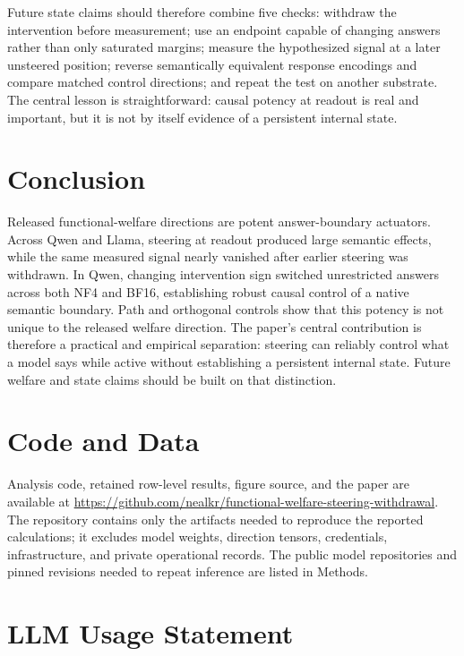 \documentclass[10pt,twocolumn]{article}
\begin{document}
Future state claims should therefore combine five checks: withdraw the intervention before measurement; use an endpoint capable of changing answers rather than only saturated margins; measure the hypothesized signal at a later unsteered position; reverse semantically equivalent response encodings and compare matched control directions; and repeat the test on another substrate. The central lesson is straightforward: causal potency at readout is real and important, but it is not by itself evidence of a persistent internal state.

\section{Conclusion}

Released functional-welfare directions are potent answer-boundary actuators. Across Qwen and Llama, steering at readout produced large semantic effects, while the same measured signal nearly vanished after earlier steering was withdrawn. In Qwen, changing intervention sign switched unrestricted answers across both NF4 and BF16, establishing robust causal control of a native semantic boundary. Path and orthogonal controls show that this potency is not unique to the released welfare direction. The paper's central contribution is therefore a practical and empirical separation: steering can reliably control what a model says while active without establishing a persistent internal state. Future welfare and state claims should be built on that distinction.

\FloatBarrier

\section*{Code and Data}

Analysis code, retained row-level results, figure source, and the paper are available at \url{https://github.com/nealkr/functional-welfare-steering-withdrawal}. The repository contains only the artifacts needed to reproduce the reported calculations; it excludes model weights, direction tensors, credentials, infrastructure, and private operational records. The public model repositories and pinned revisions needed to repeat inference are listed in Methods.

\section*{LLM Usage Statement}
\end{document}
